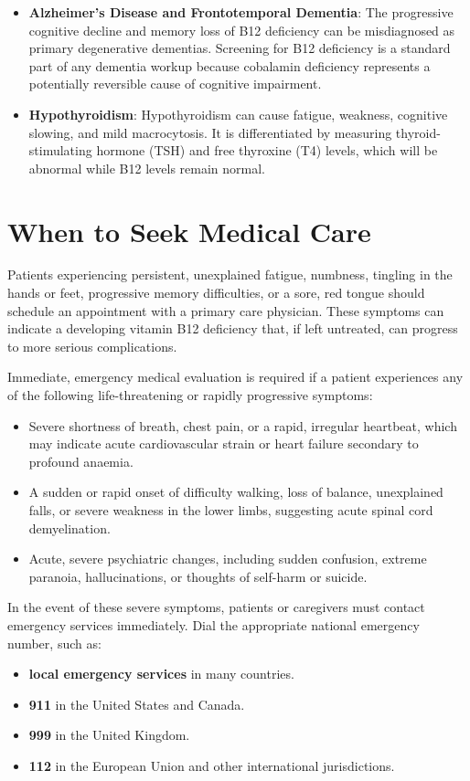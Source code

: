 \begin{itemize}
    \item \textbf{Alzheimer's Disease and Frontotemporal Dementia}: The progressive cognitive decline and memory loss of B12 deficiency can be misdiagnosed as primary degenerative dementias. Screening for B12 deficiency is a standard part of any dementia workup because cobalamin deficiency represents a potentially reversible cause of cognitive impairment.
    \item \textbf{Hypothyroidism}: Hypothyroidism can cause fatigue, weakness, cognitive slowing, and mild macrocytosis. It is differentiated by measuring thyroid-stimulating hormone (TSH) and free thyroxine (T4) levels, which will be abnormal while B12 levels remain normal.
\end{itemize}

\section*{When to Seek Medical Care}
Patients experiencing persistent, unexplained fatigue, numbness, tingling in the hands or feet, progressive memory difficulties, or a sore, red tongue should schedule an appointment with a primary care physician. These symptoms can indicate a developing vitamin B12 deficiency that, if left untreated, can progress to more serious complications.

Immediate, emergency medical evaluation is required if a patient experiences any of the following life-threatening or rapidly progressive symptoms:
\begin{itemize}
    \item Severe shortness of breath, chest pain, or a rapid, irregular heartbeat, which may indicate acute cardiovascular strain or heart failure secondary to profound anaemia.
    \item A sudden or rapid onset of difficulty walking, loss of balance, unexplained falls, or severe weakness in the lower limbs, suggesting acute spinal cord demyelination.
    \item Acute, severe psychiatric changes, including sudden confusion, extreme paranoia, hallucinations, or thoughts of self-harm or suicide.
\end{itemize}
In the event of these severe symptoms, patients or caregivers must contact emergency services immediately. Dial the appropriate national emergency number, such as:
\begin{itemize}
    \item \textbf{local emergency services} in many countries.
    \item \textbf{911} in the United States and Canada.
    \item \textbf{999} in the United Kingdom.
    \item \textbf{112} in the European Union and other international jurisdictions.
\end{itemize}

